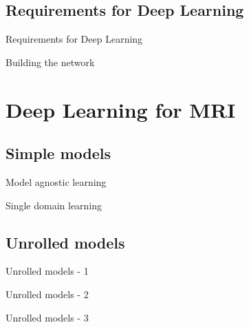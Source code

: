 \documentclass[aspectratio=169,xcolor=dvipsnames]{beamer}
\begin{document}
\subsection{Requirements for Deep Learning}
\begin{frame}{Requirements for Deep Learning}
\end{frame}

\begin{frame}{Building the network}
\end{frame}


\section{Deep Learning for MRI}
\subsection{Simple models}
\begin{frame}{Model agnostic learning}
\end{frame}

\begin{frame}{Single domain learning}
\end{frame}

\subsection{Unrolled models}
\begin{frame}{Unrolled models - 1}
\end{frame}

\begin{frame}{Unrolled models - 2}
\end{frame}

\begin{frame}{Unrolled models - 3}

\end{frame}
\end{document}

